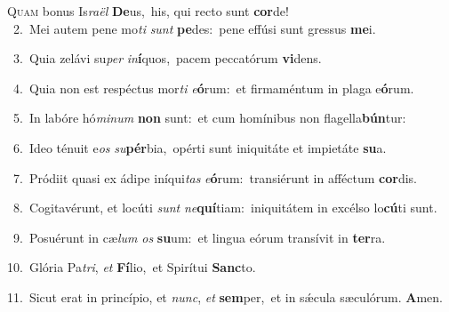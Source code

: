 \lettrine{\initial\textcolor{\initialcolor}{Q}}{uam} bonus Is\-\textit{ra}\-\textit{ël} \textbf{De}\-us,~\star his, qui recto sunt \textbf{cor}\-de!\\
{\numbfont\textcolor{\numbcolor}{~2.}}~Mei autem pene mo\textit{ti} \textit{sunt} \textbf{pe}\-des:~\star pene effúsi sunt gressus \textbf{me}\-i.\par
{\numbfont\textcolor{\numbcolor}{~3.}}~Quia zelávi su\textit{per} \textit{in}\-\textbf{í}quos,~\star pacem peccatórum \textbf{vi}\-dens.\par
{\numbfont\textcolor{\numbcolor}{~4.}}~Quia non est respéctus mor\textit{ti} \textit{e}\-\textbf{ó}rum:~\star et firmaméntum in plaga e\-\textbf{ó}\-rum.\par
{\numbfont\textcolor{\numbcolor}{~5.}}~In labóre hó\-\textit{mi}\-\textit{num} \textbf{non} sunt:~\star et cum homínibus non flagella\-\textbf{bún}\-tur:\par
{\numbfont\textcolor{\numbcolor}{~6.}}~Ideo ténuit e\textit{os} \textit{su}\-\textbf{pér}bia,~\star opérti sunt iniquitáte et impietáte \textbf{su}\-a.\par
{\numbfont\textcolor{\numbcolor}{~7.}}~Pródiit quasi ex ádipe iníqui\textit{tas} \textit{e}\-\textbf{ó}rum:~\star transiérunt in afféctum \textbf{cor}\-dis.\par
{\numbfont\textcolor{\numbcolor}{~8.}}~Cogitavérunt, et locúti \textit{sunt} \textit{ne}\-\textbf{quí}tiam:~\star iniquitátem in excélso lo\-\textbf{cú}\-ti sunt.\par
{\numbfont\textcolor{\numbcolor}{~9.}}~Posuérunt in cæ\textit{lum} \textit{os} \textbf{su}\-um:~\star et lingua eórum transívit in \textbf{ter}\-ra.\par
{\numbfont\textcolor{\numbcolor}{10.}}~Glória Pa\-\textit{tri}\-, \textit{et} \textbf{Fí}\-lio,~\star et Spirítui \textbf{Sanc}\-to.\par
{\numbfont\textcolor{\numbcolor}{11.}}~Sicut erat in princípio, et \textit{nunc}\-, \textit{et} \textbf{sem}\-per,~\star et in sǽcula sæculórum. \textbf{A}\-men.\par
